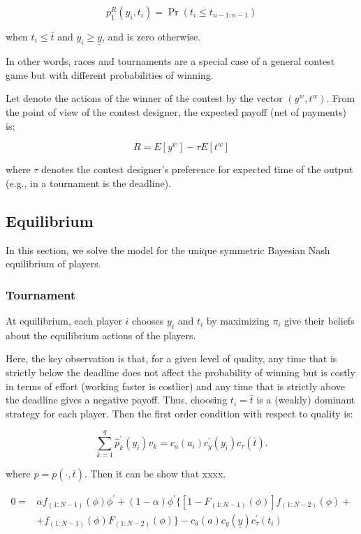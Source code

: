 \documentclass[11pt, titlepage]{article}
\newcommand\deadline{\bar{t}}
\newcommand\target{\underline{y}}
\newcommand\ctime{c_{\tau}}
\newcommand\cscore{c_{y}}
\newcommand\cability{c_{a}}
\begin{document}
\begin{equation}
    p^{R}_{1}(y_i, t_i) = \Pr(t_i \leq t_{n-1:n-1})
\end{equation}

when \(t_i\leq \deadline\) and \(y_i \geq \target\), and is zero
otherwise.

In other words, races and tournaments are a special case of a general
contest game but with different probabilities of winning.

Let denote the actions of the winner of the contest by the vector
\((y^w, t^w)\). From the point of view of the contest designer, the
expected payoff (net of payments) is:

\[
    R = E[y^w] - \tau E[t^w]
\]

where \(\tau\) denotes the contest designer's preference for expected
time of the output (e.g., in a tournament is the deadline).

\subsection{Equilibrium}\label{equilibrium}

In this section, we solve the model for the unique symmetric Bayesian
Nash equilibrium of players.

\subsubsection{Tournament}\label{tournament}

At equilibrium, each player \(i\) chooses \(y_i\) and \(t_i\) by
maximizing \(\pi_i\) give their beliefs about the equilibrium actions of
the players.

Here, the key observation is that, for a given level of quality, any
time that is strictly below the deadline does not affect the probability
of winning but is costly in terms of effort (working faster is costlier)
and any time that is strictly above the deadline gives a negative
payoff. Thus, choosing \(t_i=\deadline\) is a (weakly) dominant strategy
for each player. Then the first order condition with respect to quality
is:

\[
    \sum_{k=1}^{q} \hat p^{\prime}_{k}(y_i) v_k = \cability(a_i) \cscore^\prime(y_i) \ctime(\deadline).
\]

where \(\hat p = p(\cdot, \deadline).\) Then it can be show that xxxx.

\begin{align}
0 = & \alpha f_{(1:N-1)}(\phi) \phi^{\prime} 
    + (1-\alpha)\phi^{\prime}\{[1 - F_{(1:N-1)}(\phi)]f_{(1:N-2)}(\phi) + \nonumber\\
    & + f_{(1:N-1)}(\phi) F_{(1:N-2)}(\phi)\} 
    - c_{a}(a) c_{y}(\target) \ctime^{\prime}(t_i)
\end{align}
\end{document}

